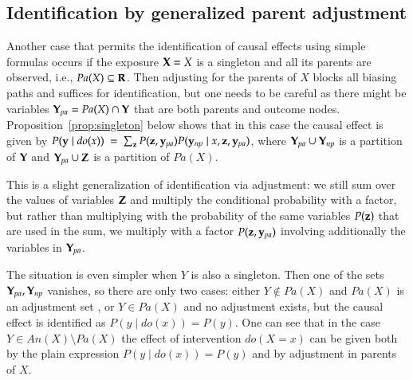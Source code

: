 \subsection{Identification by generalized parent adjustment}

Another case that permits the identification of causal effects using 
simple formulas occurs if the exposure $ {\bf X} = {X} $ is a singleton 
and all its parents are observed, i.e., $ \textit{Pa}(X) \subseteq {\bf R} $.  
Then adjusting for the parents of $X$ blocks all biasing 
paths and suffices for identification, but one needs to 
be careful as there might be variables $ {\bf Y}_{pa} = \textit{Pa}(X) \cap {\bf Y} $ 
that are both parents and outcome nodes. Proposition~\ref{prop:singleton} below
shows that in this case the causal effect is given by 
$P({\bf y} \mid \textit{do}(x)) \ =\ \sum_{{\bf z}} P({\bf z}, {\bf y}_{pa}) P({\bf y}_{np} \mid x, {\bf z}, {\bf y}_{pa})$, 
where $ {\bf Y}_{pa} \cup {\bf Y}_{np}$ is a partition of $ {\bf Y} $ and $ {\bf Y}_{pa} \cup {\bf Z} $ 
is a partition of $ \textit{Pa}(X) $. %

This is a slight generalization of identification via adjustment: 
we still sum over the values of variables $ {\bf Z} $ and multiply the conditional
probability with a factor, but rather than multiplying with the probability of
the same variables $ P({\bf z}) $ that are used in the sum, we multiply with a factor  
$ P({\bf z}, {\bf y}_{pa}) $ involving additionally the variables in $ {\bf Y}_{pa} $.

 

%
%
%
%
%
%
%
%
%
%
%
%
The situation is even simpler when $ Y $ is also a singleton. 
Then one of the sets $ {\bf Y}_{pa}, {\bf Y}_{np} $ vanishes, 
so there are only two cases: either $Y \notin \textit{Pa}(X)$ and $\textit{Pa}(X)$ 
is an adjustment set \citep[Theorem~3.2.2]{Pearl2009}, or $Y \in \textit{Pa}(X)$ 
and no adjustment exists, but the causal effect is identified as $P(y \mid \textit{do}(x)) = P(y)$.  
One can see that in the case $Y\in \textit{An}(X)\setminus\textit{Pa}(X)$
the effect of intervention $\textit{do}(X=x)$ can be given both 
by the plain expression $P(y \mid \textit{do}(x)) = P(y)$ and 
by adjustment in parents of $X$. %

%
%
%
%
%
%
%

